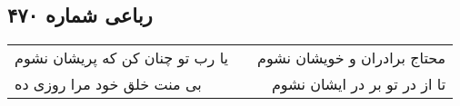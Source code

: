 \begin{center}
\section*{رباعی شماره ۴۷۰}
\label{sec:sh470}
\begin{longtable}{l p{0.5cm} r}
یا رب تو چنان کن که پریشان نشوم
&&
محتاج برادران و خویشان نشوم
\\
بی منت خلق خود مرا روزی ده
&&
تا از در تو بر در ایشان نشوم
\\
\end{longtable}
\end{center}
